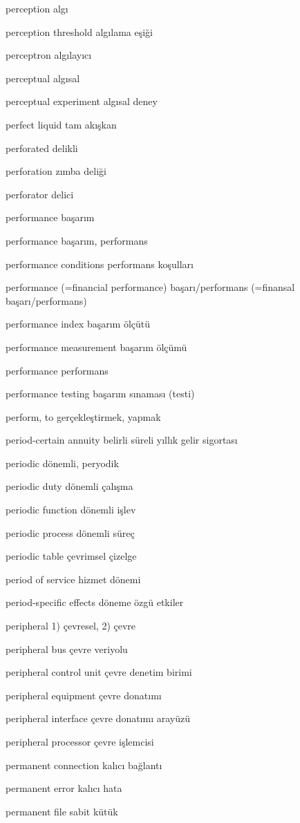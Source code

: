 \documentclass[12pt,fleqn]{article}\usepackage{../../common}
\begin{document}
perception algı

perception threshold algılama eşiği

perceptron algılayıcı

perceptual algısal

perceptual experiment algısal deney

perfect liquid tam akışkan

perforated delikli

perforation zımba deliği

perforator delici

performance başarım

performance başarım, performans

performance conditions performans koşulları

performance (=financial performance) başarı/performans (=finansal başarı/performans)

performance index başarım ölçütü

performance measurement başarım ölçümü

performance performans

performance testing başarım sınaması (testi)

perform, to gerçekleştirmek, yapmak

period-certain annuity belirli süreli yıllık gelir sigortası

periodic dönemli, peryodik

periodic duty dönemli çalışma

periodic function dönemli işlev

periodic process dönemli süreç

periodic table çevrimsel çizelge

period of service hizmet dönemi

period-specific effects döneme özgü etkiler

peripheral 1) çevresel, 2) çevre

peripheral bus çevre veriyolu

peripheral control unit çevre denetim birimi

peripheral equipment çevre donatımı

peripheral interface çevre donatımı arayüzü

peripheral processor çevre işlemcisi

permanent connection kalıcı bağlantı

permanent error kalıcı hata

permanent file sabit kütük
\end{document}
